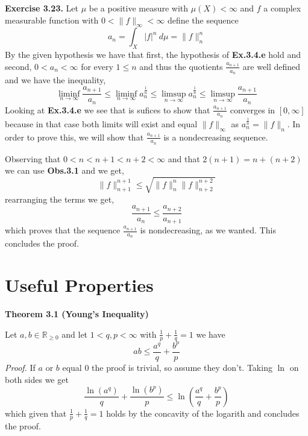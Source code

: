 \documentclass{article}
\begin{document}
\begin{exercise}\textbf{Exercise 3.23.}
    Let $\mu$ be a positive measure with $\mu \left( X \right) < \infty$ and $f$ a complex measurable function with $0 < \|f\|_\infty < \infty $ define the sequence
    \[
        a_n = \int_X |f|^n\: d\mu  = \|f\|_n^n
    \]
    By the given hypothesis we have that first, the hypothesis of \textbf{Ex.3.4.e} hold and second, $0 < a_n < \infty$ for every $ 1 \le n$ and thus the quotients $\frac{a_{n+1}}{a_n}$ are well defined and we have the inequality,
    \[
        \liminf_{n \to \infty} \frac{a_{n+1}}{a_n} \le \liminf_{n \to \infty}a_n^{\frac{1}{n}} \le \limsup_{n \to \infty} a_n^{\frac{1}{n}} \le \limsup_{n \to \infty} \frac{a_{n+1}}{a_n}
    \]
    Looking at \textbf{Ex.3.4.e} we see that is sufices to show that $\frac{a_{n+1}}{a_n}$ converges in $[0,\infty]$ because in that case both limits will exist and equal $\|f\|_\infty $ as $a_n^{\frac{1}{n}} = \|f\|_n$. In order to prove this, we will show that $\frac{a_{n+1}}{a_n}$ is a nondecreasing sequence.

    Observing that $0 < n < n+1 < n+2 < \infty$ and that $2 \left( n+1 \right) = n + \left( n+2 \right) $ we can use \textbf{Obs.3.1} and we get,
    \[
        \|f\|_{n+1}^{n+1} \le \sqrt{\|f\|_n^n \|f\|_{n+2}^{n+2}}  
    \]
    rearranging the terms we get,
    \[
        \frac{a_{n+1}}{a_n} \le \frac{a_{n+2}}{a_{n+1}}
    \]
    which proves that the sequence $\frac{a_{n+1}}{a_n}$ is nondecreasing, as we wanted. This concludes the proof.
\end{exercise}

\section*{Useful Properties}

\begin{theorem}\textbf{Theorem 3.1 (Young's Inequality)}

    Let $a,b \in \mathbb{R}_{ \ge 0}$ and let $1 < q,p < \infty$ with $\frac{1}{p}+\frac{1}{q}=1$ we have
    \[
        ab \le \frac{a^q}{q} + \frac{b^p}{p}
    \]
    \textit{Proof.} If $a$ or $b$ equal $0$ the proof is trivial, so assume they don't. Taking $\ln$ on both sides we get
    \[
        \frac{\ln \left( a^q \right) }{q} + \frac{\ln \left( b^p \right) }{p} \le \ln \left( \frac{a^q}{q} + \frac{b^p}{p} \right) 
    \]
    which given that $\frac{1}{p} + \frac{1}{q} = 1$ holds by the concavity of the logarith and concludes the proof.
\end{theorem}
\end{document}
